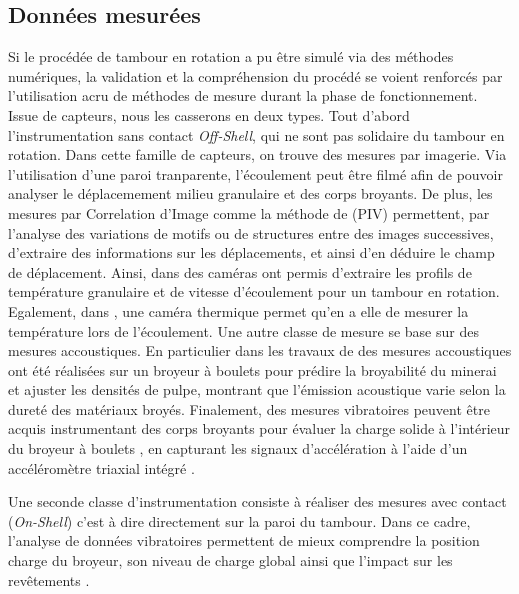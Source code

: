 \subsection{Données mesurées}

Si le procédée de tambour en rotation a pu être simulé via des méthodes numériques, la validation et la compréhension du procédé se voient renforcés par l'utilisation acru de méthodes de mesure durant la phase de fonctionnement. Issue de capteurs, nous les casserons en deux types. Tout d'abord l'instrumentation sans contact \textit{Off-Shell}, qui ne sont pas solidaire du tambour en rotation. Dans cette famille de capteurs, on trouve des mesures par imagerie. Via l'utilisation d'une paroi tranparente, l'écoulement peut être filmé afin de pouvoir analyser le déplacemement milieu granulaire et des corps broyants. De plus, les mesures par Correlation d'Image comme la méthode de  (PIV) permettent, par l'analyse des variations de motifs ou de structures entre des images successives, d'extraire des informations sur les déplacements, et ainsi d'en déduire le champ de déplacement. Ainsi, dans \cite{jarray_wet_2019} des caméras ont permis d'extraire les profils de température granulaire et de vitesse d'écoulement pour un tambour en rotation. Egalement, dans \cite{Adepu}, une caméra thermique permet qu'en a elle de mesurer la température lors de l'écoulement.
Une autre classe de mesure se base sur des mesures accoustiques. En particulier dans les travaux de \cite{Owusu} des mesures accoustiques ont été réalisées sur un broyeur à boulets pour prédire la broyabilité du minerai et ajuster les densités de pulpe, montrant que l'émission acoustique varie selon la dureté des matériaux broyés.
Finalement, des mesures vibratoires peuvent être acquis instrumentant des corps broyants pour évaluer la charge solide à l'intérieur du broyeur à boulets , en capturant les signaux d'accélération à l'aide d'un accéléromètre triaxial intégré \cite{Wang}.

Une seconde classe d'instrumentation consiste à réaliser des mesures avec contact (\textit{On-Shell}) c'est à dire directement sur la paroi du tambour. Dans ce cadre, l'analyse de données vibratoires permettent de mieux comprendre la position charge du broyeur, son niveau de charge global ainsi que l'impact sur les revêtements \cite{Davey}.
